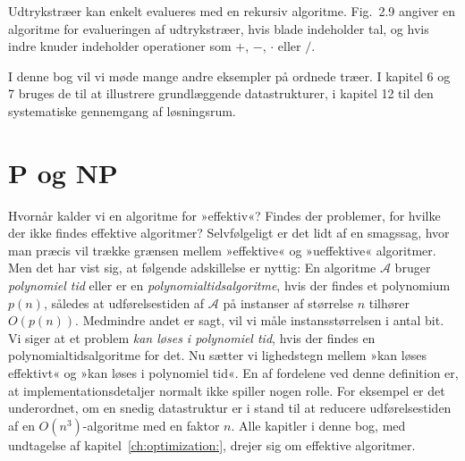 Udtrykstræer kan enkelt evalueres med en rekursiv algoritme.
Fig.~2.9 angiver en algoritme for evalueringen af udtrykstræer, hvis blade indeholder tal, og hvis indre knuder indeholder operationer som $+$, $-$, $\cdot$ eller $/$.

I denne bog vil vi møde mange andre eksempler på ordnede træer.
I kapitel 6 og 7 bruges de til at illustrere grundlæggende datastrukturer, i kapitel 12 til den systematiske gennemgang af løsningsrum.
\section{P og NP}

%
%
%

Hvornår kalder vi en  algoritme for »effektiv«?
Findes der problemer, for hvilke der ikke findes effektive algoritmer?
Selvfølgeligt er det lidt af en smagssag, hvor man præcis vil trække grænsen mellem »effektive« og »ueffektive« algoritmer.
Men det har vist sig, at følgende adskillelse er nyttig:
En algoritme $\mathcal{A}$ bruger \emph{polynomiel tid} eller er en  \emph{polynomialtidsalgoritme},
hvis der findes et polynomium $p(n)$, således at udførelsestiden  af $\mathcal{A}$ på instanser af størrelse $n$ tilhører $O(p(n))$. 
Medmindre andet er sagt, vil vi måle instansstørrelsen i antal bit.
Vi siger at et problem \emph{kan løses i polynomiel tid}, hvis der findes en polynomialtidsalgoritme for det.
Nu sætter vi lighedstegn mellem »kan løses effektivt« og »kan løses i polynomiel tid«. 
En af fordelene ved denne definition er, at implementationsdetaljer normalt ikke spiller nogen rolle.
For eksempel er det underordnet, om en snedig datastruktur er i stand til at reducere udførelsestiden af en $O(n^3)$-algoritme med en faktor $n$.
Alle kapitler i denne bog, med undtagelse af kapitel~\ref{ch:optimization:}, drejer sig om effektive algoritmer.
  
